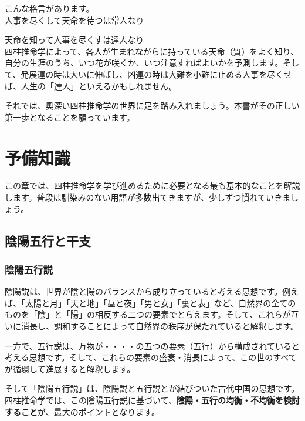 \documentclass[a5paper,11pt,dvipdfmx]{tarticle}
\begin{document}
こんな格言があります。\\

人事を尽くして天命を待つは常人なり

天命を知って人事を尽くすは達人なり\\

四柱推命学によって、各人が生まれながらに持っている天命（質）をよく知り、自分の生涯のうち、いつ花が咲くか、いつ注意すればよいかを予測します。そして、発展運の時は大いに伸ばし、凶運の時は大難を小難に止める人事を尽くせば、人生の「達人」といえるかもしれません。

それでは、奥深い四柱推命学の世界に足を踏み入れましょう。本書がその正しい第一歩となることを願っています。

\clearpage

\section{予備知識}

この章では、四柱推命学を学び進めるために必要となる最も基本的なことを解説します。普段は馴染みのない用語が多数出てきますが、少しずつ慣れていきましょう。

\subsection{陰陽五行と干支}
\subsubsection*{陰陽五行説}
陰陽説は、世界が陰と陽のバランスから成り立っていると考える思想です。例えば、「太陽と月」「天と地」「昼と夜」「男と女」「裏と表」など、自然界の全てのものを「陰」と「陽」の相反する二つの要素でとらえます。そして、これらが互いに消長し、調和することによって自然界の秩序が保たれていると解釈します。

一方で、五行説は、万物が・・・・の五つの要素（五行）から構成されていると考える思想です。そして、これらの要素の盛衰・消長によって、この世のすべてが循環して進展すると解釈します。

そして「陰陽五行説」は、陰陽説と五行説とが結びついた古代中国の思想です。四柱推命学では、この陰陽五行説に基づいて、\textbf{陰陽・五行の均衡・不均衡を検討すること}が、最大のポイントとなります。

\subsubsection*{}
\end{document}
